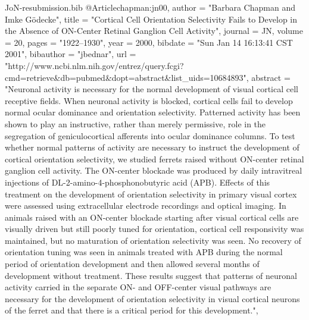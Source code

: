 \documentclass{article}
\begin{document}
\begin{filecontents}{JoN-resubmission.bib}
@Article{chapman:jn00,
  author       = "Barbara Chapman and Imke G{\"o}decke",
  title	       = "Cortical Cell Orientation Selectivity Fails to
                  Develop in the Absence of {ON}-Center Retinal
                  Ganglion Cell Activity",
  journal      = JN,
  volume       = 20,
  pages	       = "1922--1930",
  year	       = 2000,
  bibdate      = "Sun Jan 14 16:13:41 CST 2001",
  bibauthor    = "jbednar",
  url	       = "http://www.ncbi.nlm.nih.gov/entrez/query.fcgi?cmd=retrieve&db=pubmed&dopt=abstract&list_uids=10684893",
  abstract     = "Neuronal activity is necessary for the normal
                  development of visual cortical cell receptive
                  fields. When neuronal activity is blocked, cortical
                  cells fail to develop normal ocular dominance and
                  orientation selectivity. Patterned activity has been
                  shown to play an instructive, rather than merely
                  permissive, role in the segregation of
                  geniculocortical afferents into ocular dominance
                  columns. To test whether normal patterns of activity
                  are necessary to instruct the development of
                  cortical orientation selectivity, we studied ferrets
                  raised without ON-center retinal ganglion cell
                  activity. The ON-center blockade was produced by
                  daily intravitreal injections of
                  DL-2-amino-4-phosphonobutyric acid (APB). Effects of
                  this treatment on the development of orientation
                  selectivity in primary visual cortex were assessed
                  using extracellular electrode recordings and optical
                  imaging. In animals raised with an ON-center
                  blockade starting after visual cortical cells are
                  visually driven but still poorly tuned for
                  orientation, cortical cell responsivity was
                  maintained, but no maturation of orientation
                  selectivity was seen. No recovery of orientation
                  tuning was seen in animals treated with APB during
                  the normal period of orientation development and
                  then allowed several months of development without
                  treatment. These results suggest that patterns of
                  neuronal activity carried in the separate ON- and
                  OFF-center visual pathways are necessary for the
                  development of orientation selectivity in visual
                  cortical neurons of the ferret and that there is a
                  critical period for this development.",
}


\end{filecontents}
\end{document}
